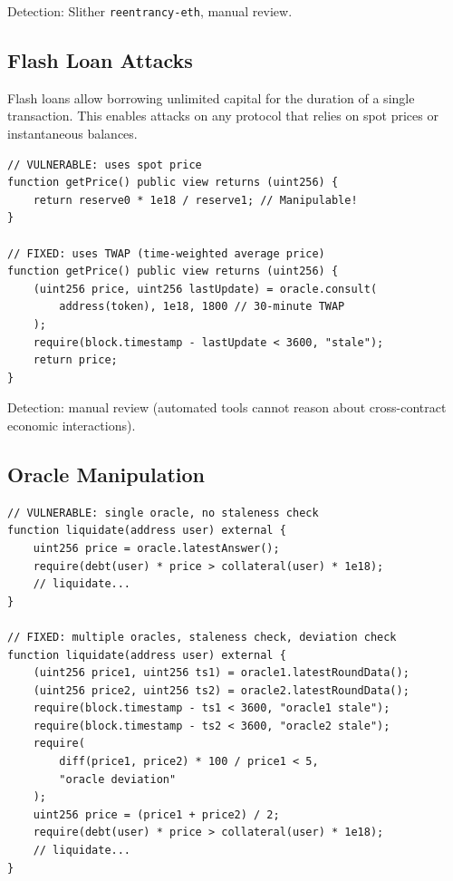 \documentclass[11pt,a4paper]{article}
\begin{document}
Detection: Slither \texttt{reentrancy-eth}, manual review.

\subsection{Flash Loan Attacks}

Flash loans allow borrowing unlimited capital for the duration of a single transaction.
This enables attacks on any protocol that relies on spot prices or instantaneous balances.

\begin{lstlisting}[language=Solidity,caption={Flash loan attack on a naive oracle}]
// VULNERABLE: uses spot price
function getPrice() public view returns (uint256) {
    return reserve0 * 1e18 / reserve1; // Manipulable!
}

// FIXED: uses TWAP (time-weighted average price)
function getPrice() public view returns (uint256) {
    (uint256 price, uint256 lastUpdate) = oracle.consult(
        address(token), 1e18, 1800 // 30-minute TWAP
    );
    require(block.timestamp - lastUpdate < 3600, "stale");
    return price;
}
\end{lstlisting}

Detection: manual review (automated tools cannot reason about cross-contract economic interactions).

\subsection{Oracle Manipulation}

\begin{lstlisting}[language=Solidity,caption={Oracle manipulation defense}]
// VULNERABLE: single oracle, no staleness check
function liquidate(address user) external {
    uint256 price = oracle.latestAnswer();
    require(debt(user) * price > collateral(user) * 1e18);
    // liquidate...
}

// FIXED: multiple oracles, staleness check, deviation check
function liquidate(address user) external {
    (uint256 price1, uint256 ts1) = oracle1.latestRoundData();
    (uint256 price2, uint256 ts2) = oracle2.latestRoundData();
    require(block.timestamp - ts1 < 3600, "oracle1 stale");
    require(block.timestamp - ts2 < 3600, "oracle2 stale");
    require(
        diff(price1, price2) * 100 / price1 < 5,
        "oracle deviation"
    );
    uint256 price = (price1 + price2) / 2;
    require(debt(user) * price > collateral(user) * 1e18);
    // liquidate...
}
\end{lstlisting}
\end{document}
